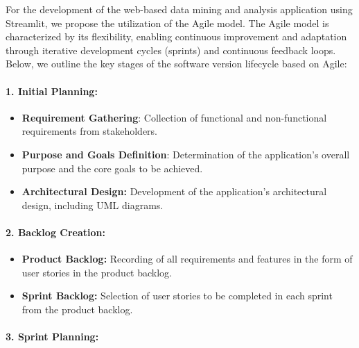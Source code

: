 \documentclass[unnumsec,webpdf,contemporary,large]{oup-authoring-template}%
\theoremstyle{thmstyleone}%
\theoremstyle{thmstyletwo}%
\theoremstyle{thmstylethree}%
\begin{document}
For the development of the web-based data mining and analysis application using Streamlit, we propose the utilization of the Agile model. The Agile model is characterized by its flexibility, enabling continuous improvement and adaptation through iterative development cycles (sprints) and continuous feedback loops. Below, we outline the key stages of the software version lifecycle based on Agile:
\vspace{0.2cm}

\paragraph{1. Initial Planning:}
\vspace{0.2cm}

\begin{itemize}
    \item \textbf{Requirement Gathering}: Collection of functional and non-functional requirements from stakeholders.
    \vspace{0.1cm}
    \item \textbf{Purpose and Goals Definition}: Determination of the application's overall purpose and the core goals to be achieved.
    \vspace{0.1cm}
    \item \textbf{Architectural Design:} Development of the application's architectural design, including UML diagrams.
\end{itemize}
\vspace{0.1cm}

\paragraph{2. Backlog Creation:}
\vspace{0.2cm}

\begin{itemize}
    \item \textbf{Product Backlog:} Recording of all requirements and features in the form of user stories in the product backlog.
    \vspace{0.1cm}
    \item \textbf{Sprint Backlog:} Selection of user stories to be completed in each sprint from the product backlog.
\end{itemize}
\vspace{0.1cm}

\paragraph{3. Sprint Planning:}
\vspace{0.2cm}
\end{document}
